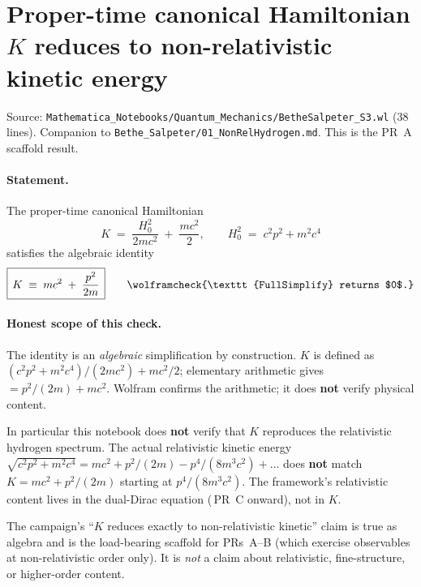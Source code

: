 \section{Proper-time canonical Hamiltonian $K$ reduces to non-relativistic kinetic energy}
\label{sec:eq-bs-s3}

Source: \texttt{Mathematica\_Notebooks/Quantum\_Mechanics/BetheSalpeter\_S3.wl}
(38 lines). Companion to \texttt{Bethe\_Salpeter/01\_NonRelHydrogen.md}.
This is the PR~A scaffold result.

\paragraph{Statement.}
The proper-time canonical Hamiltonian
\[
K \;=\; \frac{H_0^2}{2 m c^2} \;+\; \frac{m c^2}{2}, \qquad H_0^2 \;=\; c^2 p^2 + m^2 c^4
\]
satisfies the algebraic identity
\[
\boxed{\,K \;\equiv\; m c^2 \;+\; \frac{p^2}{2 m}\,}
\qquad \wolframcheck{\texttt{FullSimplify} returns $0$.}
\]

\paragraph{Honest scope of this check.}
The identity is an \emph{algebraic} simplification by construction. $K$ is
defined as $(c^2 p^2 + m^2 c^4)/(2 m c^2) + m c^2 / 2$; elementary arithmetic
gives $= p^2/(2m) + m c^2$. Wolfram confirms the arithmetic; it does
\textbf{not} verify physical content.

In particular this notebook does \textbf{not} verify that $K$ reproduces the
relativistic hydrogen spectrum. The actual relativistic kinetic energy
$\sqrt{c^2 p^2 + m^2 c^4} = m c^2 + p^2/(2m) - p^4/(8 m^3 c^2) + \dots$ does
\textbf{not} match $K = m c^2 + p^2/(2m)$ starting at $p^4/(8 m^3 c^2)$. The
framework's relativistic content lives in the dual-Dirac equation
(\,PR~C onward), not in $K$.

The campaign's ``$K$ reduces exactly to non-relativistic kinetic'' claim is
true as algebra and is the load-bearing scaffold for PRs~A--B (which exercise
observables at non-relativistic order only). It is \emph{not} a claim about
relativistic, fine-structure, or higher-order content.

